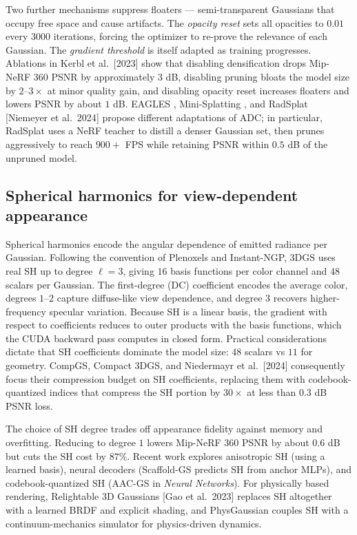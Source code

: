 \documentclass{article}
\begin{document}
Two further mechanisms suppress floaters --- semi-transparent Gaussians that occupy free space and cause artifacts. The \emph{opacity reset} sets all opacities to \(0.01\) every \(3000\) iterations, forcing the optimizer to re-prove the relevance of each Gaussian. The \emph{gradient threshold} is itself adapted as training progresses. Ablations in Kerbl et al.~{[}2023{]} show that disabling densification drops Mip-NeRF 360 PSNR by approximately \(3\) dB, disabling pruning bloats the model size by \(2\)--\(3\times\) at minor quality gain, and disabling opacity reset increases floaters and lowers PSNR by about \(1\) dB. EAGLES \cite{girish2024eaglesefficientacc}, Mini-Splatting \cite{fang2024minisplattingrepre}, and RadSplat {[}Niemeyer et al.~2024{]} propose different adaptations of ADC; in particular, RadSplat uses a NeRF teacher to distill a denser Gaussian set, then prunes aggressively to reach \(900+\) FPS while retaining PSNR within \(0.5\) dB of the unpruned model.

\subsection{Spherical harmonics for view-dependent appearance}\label{spherical-harmonics-for-view-dependent-appearance}

Spherical harmonics encode the angular dependence of emitted radiance per Gaussian. Following the convention of Plenoxels and Instant-NGP, 3DGS uses real SH up to degree \(\ell=3\), giving \(16\) basis functions per color channel and \(48\) scalars per Gaussian. The first-degree (DC) coefficient encodes the average color, degrees \(1\)--\(2\) capture diffuse-like view dependence, and degree \(3\) recovers higher-frequency specular variation. Because SH is a linear basis, the gradient with respect to coefficients reduces to outer products with the basis functions, which the CUDA backward pass computes in closed form. Practical considerations dictate that SH coefficients dominate the model size: \(48\) scalars vs \(11\) for geometry. CompGS, Compact 3DGS, and Niedermayr et al.~{[}2024{]} consequently focus their compression budget on SH coefficients, replacing them with codebook-quantized indices that compress the SH portion by \(30\times\) at less than \(0.3\) dB PSNR loss.

The choice of SH degree trades off appearance fidelity against memory and overfitting. Reducing to degree \(1\) lowers Mip-NeRF 360 PSNR by about \(0.6\) dB but cuts the SH cost by \(87\%\). Recent work explores anisotropic SH (using a learned basis), neural decoders (Scaffold-GS predicts SH from anchor MLPs), and codebook-quantized SH (AAC-GS \cite{wan2025aacgsattentionawar} in \emph{Neural Networks}). For physically based rendering, Relightable 3D Gaussians {[}Gao et al.~2023{]} replaces SH altogether with a learned BRDF and explicit shading, and PhysGaussian \cite{xie2024physgaussianphysic} couples SH with a continuum-mechanics simulator for physics-driven dynamics.
\end{document}
